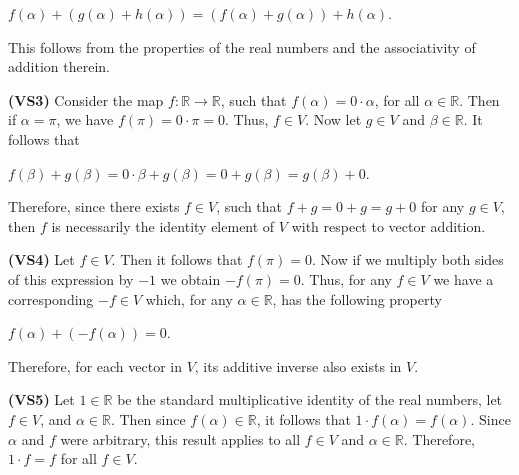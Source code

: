 \documentclass[12pt, a4paper]{article}
\begin{document}
\begin{enumerate}
    \vspace{2mm}
    
    \centerline{$f(\alpha)+(g(\alpha)+h(\alpha))=(f(\alpha)+g(\alpha))+h(\alpha)$.}
    
    \vspace{2mm}
    
    This follows from the properties of the real numbers and the associativity of addition therein.\par
    
    \vspace{4mm}
    
    \textbf{(VS3) }Consider the map $f\colon\mathbb{R}\rightarrow\mathbb{R}$, such that $f(\alpha)=0\cdot\alpha$, for all $\alpha\in\mathbb{R}$. Then if $\alpha=\pi$, we have $f(\pi)=0\cdot\pi=0$. Thus, $f\in V$. Now let $g\in V$ and $\beta\in\mathbb{R}$. It follows that\par
    
    \vspace{2mm}
    
    \centerline{$f(\beta)+g(\beta)=0\cdot\beta+g(\beta)=0+g(\beta)=g(\beta)+0$.}
    
    \vspace{2mm}
    
    Therefore, since there exists $f\in V$, such that $f+g=0+g=g+0$ for any $g\in V$, then $f$ is necessarily the identity element of $V$ with respect to vector addition.
    
    \vspace{4mm}
    
    \textbf{(VS4) }Let $f\in V$. Then it follows that $f(\pi)=0$. Now if we multiply both sides of this expression by $-1$ we obtain $-f(\pi)=0$. Thus, for any $f\in V$ we have a corresponding $-f\in V$ which, for any $\alpha\in\mathbb{R}$, has the following property\par
    
    \vspace{2mm}
    
    \centerline{$f(\alpha)+(-f(\alpha))=0$.}
    
    \vspace{2mm}
    
    Therefore, for each vector in $V$, its additive inverse also exists in $V$.
    
    \vspace{4mm}
    
    \textbf{(VS5) }Let $1\in\mathbb{R}$ be the standard multiplicative identity of the real numbers, let $f\in V$, and $\alpha\in\mathbb{R}$. Then since $f(\alpha)\in\mathbb{R}$, it follows that $1\cdot f(\alpha)=f(\alpha)$. Since $\alpha$ and $f$ were arbitrary, this result applies to all $f\in V$ and $\alpha\in\mathbb{R}$. Therefore, $1\cdot f=f$ for all $f\in V$.
    

\end{enumerate}
\end{document}
